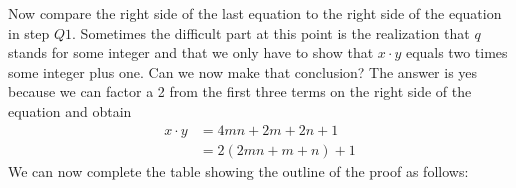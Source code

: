 Now compare the right side of the last equation to the right side of the equation in step $Q1$.  Sometimes the difficult part at this point is the realization that  $q$  stands for  some integer and that we only have to show that $x \cdot y$ equals two times some integer plus one.  Can we now make that conclusion?  The answer is yes because we can factor a 2 from the first three terms on the right side of the equation and obtain
\begin{align*}
x \cdot y &= 4mn + 2m + 2n + 1 \\
          &= 2 (2mn + m + n) + 1
\end{align*}
We can now complete the table showing the outline of the proof as follows:

